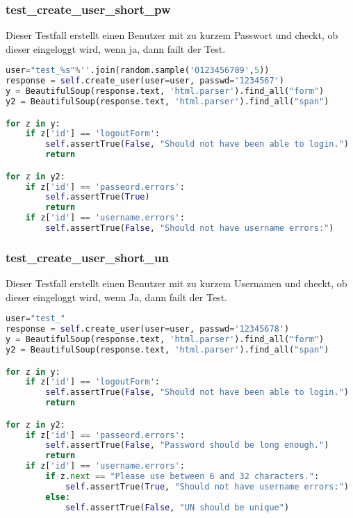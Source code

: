 \subsubsection{test\_create\_user\_short\_pw}
Dieser Testfall erstellt einen Benutzer mit zu kurzem Passwort und checkt, ob
 dieser eingeloggt wird, wenn ja, dann failt der Test.
\begin{lstlisting}[language=Python]
user="test_%s"%''.join(random.sample('0123456789',5))
response = self.create_user(user=user, passwd='1234567')
y = BeautifulSoup(response.text, 'html.parser').find_all("form")
y2 = BeautifulSoup(response.text, 'html.parser').find_all("span")

for z in y:
    if z['id'] == 'logoutForm':
        self.assertTrue(False, "Should not have been able to login.")
        return

for z in y2:
    if z['id'] == 'passeord.errors':
        self.assertTrue(True)
        return
    if z['id'] == 'username.errors':
        self.assertTrue(False, "Should not have username errors:")
\end{lstlisting}

\subsubsection{test\_create\_user\_short\_un}
Dieser Testfall erstellt einen Benutzer mit zu kurzem Usernamen und checkt, ob
 dieser eingeloggt wird, wenn Ja, dann failt der Test.
\begin{lstlisting}[language=Python]
user="test_"
response = self.create_user(user=user, passwd='12345678')
y = BeautifulSoup(response.text, 'html.parser').find_all("form")
y2 = BeautifulSoup(response.text, 'html.parser').find_all("span")

for z in y:
    if z['id'] == 'logoutForm':
        self.assertTrue(False, "Should not have been able to login.")
        return

for z in y2:
    if z['id'] == 'passeord.errors':
        self.assertTrue(False, "Password should be long enough.")
        return
    if z['id'] == 'username.errors':
        if z.next == "Please use between 6 and 32 characters.":
            self.assertTrue(True, "Should not have username errors:")
        else:
            self.assertTrue(False, "UN should be unique")
\end{lstlisting}

